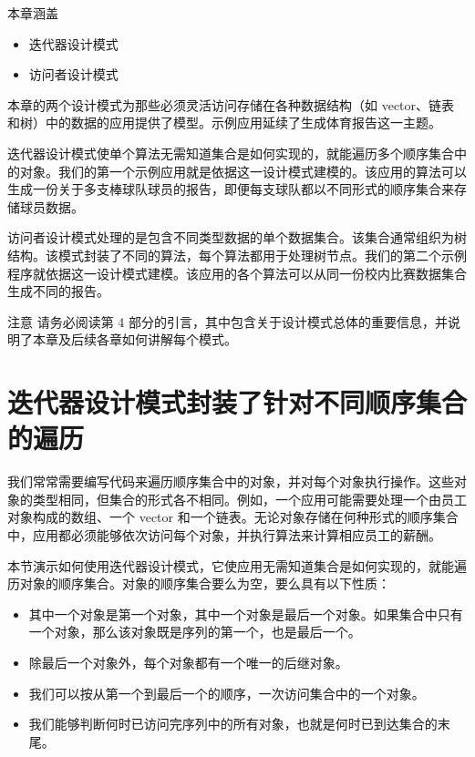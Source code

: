 \begin{myChapterIntro}{本章涵盖}
\begin{itemize}
\item 迭代器设计模式
\item 访问者设计模式
\end{itemize}
\end{myChapterIntro}

本章的两个设计模式为那些必须灵活访问存储在各种数据结构（如 vector、链表和树）中的数据的应用提供了模型。示例应用延续了生成体育报告这一主题。


迭代器设计模式使单个算法无需知道集合是如何实现的，就能遍历多个顺序集合中的对象。我们的第一个示例应用就是依据这一设计模式建模的。该应用的算法可以生成一份关于多支棒球队球员的报告，即便每支球队都以不同形式的顺序集合来存储球员数据。

访问者设计模式处理的是包含不同类型数据的单个数据集合。该集合通常组织为树结构。该模式封装了不同的算法，每个算法都用于处理树节点。我们的第二个示例程序就依据这一设计模式建模。该应用的各个算法可以从同一份校内比赛数据集合生成不同的报告。


\begin{myWarning}{注意}
请务必阅读第 4 部分的引言，其中包含关于设计模式总体的重要信息，并说明了本章及后续各章如何讲解每个模式。
\end{myWarning}

\section{迭代器设计模式封装了针对不同顺序集合的遍历}

我们常常需要编写代码来遍历顺序集合中的对象，并对每个对象执行操作。这些对象的类型相同，但集合的形式各不相同。例如，一个应用可能需要处理一个由员工对象构成的数组、一个 vector 和一个链表。无论对象存储在何种形式的顺序集合中，应用都必须能够依次访问每个对象，并执行算法来计算相应员工的薪酬。

本节演示如何使用迭代器设计模式，它使应用无需知道集合是如何实现的，就能遍历对象的顺序集合。对象的顺序集合要么为空，要么具有以下性质：

\begin{itemize}
\item 其中一个对象是第一个对象，其中一个对象是最后一个对象。如果集合中只有一个对象，那么该对象既是序列的第一个，也是最后一个。
\item 除最后一个对象外，每个对象都有一个唯一的后继对象。
\item 我们可以按从第一个到最后一个的顺序，一次访问集合中的一个对象。
\item 我们能够判断何时已访问完序列中的所有对象，也就是何时已到达集合的末尾。
\end{itemize}

